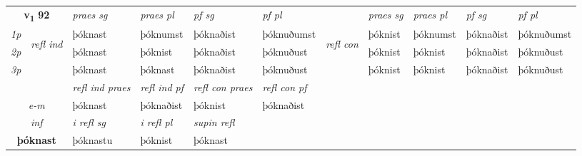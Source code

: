 \noindent
\begin{tabular}{lllllllllll} \toprule
\multicolumn{2}{c}{\textbf{v{\textsubscript{1}}} \Large{\textbf{92}}}  &  \textit{praes sg}  & \textit{praes pl}  &\textit{ pf sg} & \textit{pf pl} &  &  \textit{praes sg}  & \textit{praes pl}  & \textit{pf sg} & \textit{pf pl } \\*
	\cmidrule{3-6} \cmidrule{8-11}
 {\textit{1p}} & \multirow{3}{*}{\begin{turn}{90}\textit{refl ind}\end{turn}}  & þóknast & þóknumst & þóknaðist & þóknuðumst & \multirow{3}{*}{\begin{turn}{90}\textit{refl con}\end{turn}}  &þóknist & þóknumst & þóknaðist & þóknuðumst \\*
 {\textit{2p}} &  & þóknast & þóknist & þóknaðist & þóknuðust & &þóknist & þóknist & þóknaðist & þóknuðust \\*
 {\textit{3p}}  & & þóknast & þóknast & þóknaðist & þóknuðust & & þóknist & þóknist& þóknaðist & þóknuðust \\*
\cmidrule{3-6} \cmidrule{8-11}

 & & \textit{refl ind praes} & \textit{refl ind pf} & \textit{refl con praes} & \textit{refl con pf} \\*
 \multicolumn{2}{c}{ \textit{e-m} }& þóknast & þóknaðist & þóknist & þóknaðist \\*

\cmidrule{3-5}
   \multicolumn{2}{c}{\textit{inf}}   & \textit{i refl sg} & \textit{i refl pl}   & \textit{supin refl}  \\*
  \multicolumn{2}{c}{\textbf{þóknast}}    & þóknastu & þóknist   & þóknast  \\*
\end{tabular}

